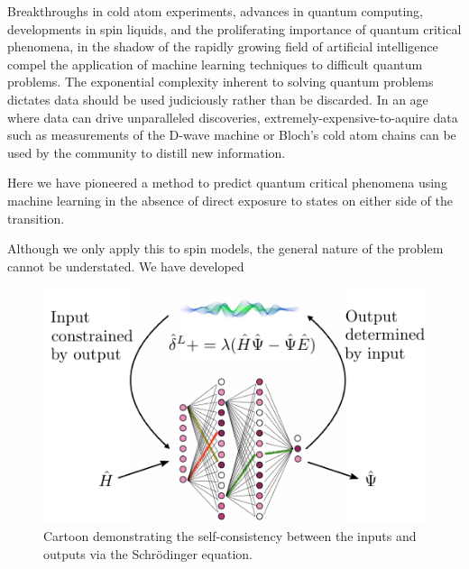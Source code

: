 Breakthroughs in cold atom experiments, advances in quantum computing,
developments in spin liquids, and the proliferating importance of quantum
critical phenomena, in the shadow of the rapidly growing field of artificial
intelligence compel the application of machine learning techniques to difficult
quantum problems.  The exponential complexity inherent to solving quantum
problems dictates data should be used judiciously rather than be discarded. In an age
where data can drive unparalleled discoveries,
extremely-expensive-to-aquire data such as measurements of the D-wave machine
or Bloch's cold atom chains can be used by the community to distill new
information.  


Here we have pioneered a method to predict quantum critical phenomena
using machine learning in the absence of direct exposure to states on either
side of the transition.  

Although we only apply this to spin models, the general nature of the problem cannot 
be understated. We have developed 

\begin{figure}
	\includegraphics{figures/schematic}
	\caption{Cartoon demonstrating the self-consistency between the inputs and 
	outputs via the Schr\"{o}dinger equation.}
	\label{schematic}
\end{figure}

